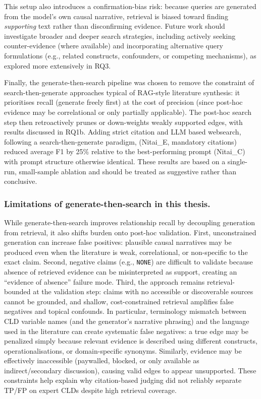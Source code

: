 This setup also introduces a confirmation-bias risk: because queries are generated from the model's own causal narrative, retrieval is biased toward finding \textit{supporting} text rather than disconfirming evidence. Future work should investigate broader and deeper search strategies, including actively seeking counter-evidence (where available) and incorporating alternative query formulations (e.g., related constructs, confounders, or competing mechanisms), as explored more extensively in RQ3.

Finally, the generate-then-search pipeline was chosen to remove the constraint of search-then-generate approaches typical of RAG-style literature synthesis: it prioritises recall (generate freely first) at the cost of precision (since post-hoc evidence may be correlational or only partially applicable). The post-hoc search step then retroactively prunes or down-weights weakly supported edges, with results discussed in RQ1b.
Adding strict citation and LLM based websearch, following a search-then-generate paradigm, (Nitai\_E, mandatory citations) reduced average F1 by 25\% relative to the best-performing prompt (Nitai\_C) with prompt structure otherwise identical. These results are based on a single-run, small-sample ablation and should be treated as suggestive rather than conclusive.

\subsubsection{Limitations of generate-then-search in this thesis.}
While generate-then-search improves relationship recall by decoupling generation from retrieval, it also shifts burden onto post-hoc validation. First, unconstrained generation can increase false positives: plausible causal narratives may be produced even when the literature is weak, correlational, or non-specific to the exact claim. Second, negative claims (e.g., \texttt{NONE}) are difficult to validate because absence of retrieved evidence can be misinterpreted as support, creating an ``evidence of absence'' failure mode. Third, the approach remains retrieval-bounded at the validation step: claims with no accessible or discoverable sources cannot be grounded, and shallow, cost-constrained retrieval amplifies false negatives and topical confounds. In particular, terminology mismatch between CLD variable names (and the generator's narrative phrasing) and the language used in the literature can create systematic false negatives: a true edge may be penalized simply because relevant evidence is described using different constructs, operationalisations, or domain-specific synonyms. Similarly, evidence may be effectively inaccessible (paywalled, blocked, or only available as indirect/secondary discussion), causing valid edges to appear unsupported. These constraints help explain why citation-based judging did not reliably separate TP/FP on expert CLDs despite high retrieval coverage.


